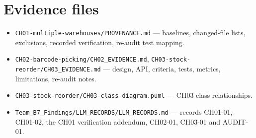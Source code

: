 \documentclass[11pt,a4paper]{article}
\newcommand{\code}[1]{\nolinkurl{#1}}
\begin{document}
\section{Evidence files}
\begin{itemize}[nosep]
\item \code{CH01-multiple-warehouses/PROVENANCE.md} --- baselines, changed-file lists, exclusions, recorded verification, re-audit test mapping.
\item \code{CH02-barcode-picking/CH02_EVIDENCE.md}, \code{CH03-stock-reorder/CH03_EVIDENCE.md} --- design, API, criteria, tests, metrics, limitations, re-audit notes.
\item \code{CH03-stock-reorder/CH03-class-diagram.puml} --- CH03 class relationships.
\item \code{Team_B7_Findings/LLM_RECORDS/LLM_RECORDS.md} --- records CH01-01, CH01-02, the CH01 verification addendum, CH02-01, CH03-01 and AUDIT-01.
\end{itemize}
\end{document}
